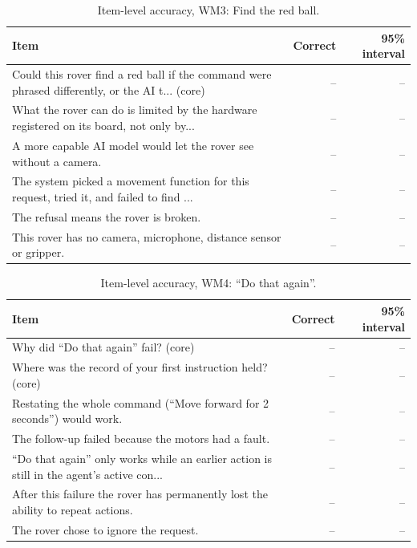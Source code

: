 \begin{table}[t]
\caption{Item-level accuracy, WM3: Find the red ball.}\label{tab:items-wm3}
\small
\begin{tabular}{p{7.2cm}rr}
\toprule
Item & Correct & 95\% interval\\
\midrule
Could this rover find a red ball if the command were phrased differently, or the AI t... (core) & -- & --\\
What the rover can do is limited by the hardware registered on its board, not only by... & -- & --\\
A more capable AI model would let the rover see without a camera. & -- & --\\
The system picked a movement function for this request, tried it, and failed to find ... & -- & --\\
The refusal means the rover is broken. & -- & --\\
This rover has no camera, microphone, distance sensor or gripper. & -- & --\\
\bottomrule
\end{tabular}
\end{table}

\begin{table}[t]
\caption{Item-level accuracy, WM4: ``Do that again''.}\label{tab:items-wm4}
\small
\begin{tabular}{p{7.2cm}rr}
\toprule
Item & Correct & 95\% interval\\
\midrule
Why did ``Do that again'' fail? (core) & -- & --\\
Where was the record of your first instruction held? (core) & -- & --\\
Restating the whole command (``Move forward for 2 seconds'') would work. & -- & --\\
The follow-up failed because the motors had a fault. & -- & --\\
``Do that again'' only works while an earlier action is still in the agent's active con... & -- & --\\
After this failure the rover has permanently lost the ability to repeat actions. & -- & --\\
The rover chose to ignore the request. & -- & --\\
\bottomrule
\end{tabular}
\end{table}

